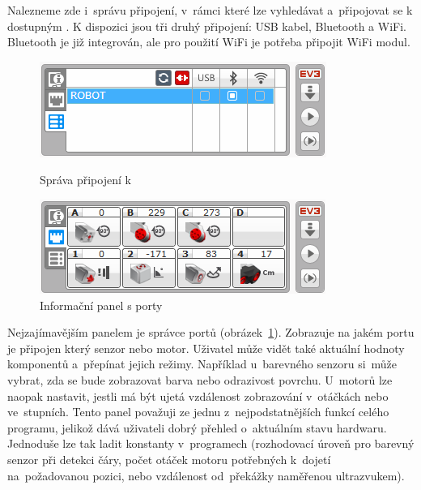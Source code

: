 Nalezneme zde i~správu připojení, v~rámci které lze vyhledávat a~připojovat se k dostupným . 
K dispozici jsou tři druhý připojení: USB kabel, Bluetooth a WiFi. Bluetooth je již integrován, ale pro použití WiFi je potřeba připojit WiFi modul.

\begin{figure}[h]
	\begin{minipage}[b]{.48\textwidth}
		\centering
		\includegraphics[width=\textwidth]{images/lego-soft_brick-manager_connected.png}
		\caption{Správa připojení k }
		\label{fig:lego-soft_brick-manager-connected}
	\end{minipage}
	\hfill
	\begin{minipage}[b]{.48\textwidth}
		\centering
		\includegraphics[width=\textwidth]{images/lego-soft_brick_port-view.png}
		\caption{Informační panel s porty}
		\label{fig:lego-soft_brick_port-view}
	\end{minipage}
\end{figure}

Nejzajímavějším panelem je správce portů (obrázek~\ref{fig:lego-soft_brick_port-view}). 
Zobrazuje na jakém portu je připojen který senzor nebo motor. 
Uživatel může vidět také aktuální hodnoty komponentů a~přepínat jejich režimy.    
Například u~barevného senzoru si~může vybrat, zda se bude zobrazovat barva nebo odrazivost povrchu. U~motorů lze naopak nastavit, jestli má být ujetá vzdálenost zobrazování v~otáčkách nebo ve~stupních. 
Tento panel považuji ze jednu z~nejpodstatnějších funkcí celého programu, jelikož dává uživateli dobrý přehled o~aktuálním stavu hardwaru. 
Jednoduše lze tak ladit konstanty v~programech (rozhodovací úroveň pro barevný senzor při detekci čáry, počet otáček motoru potřebných k~dojetí na~požadovanou pozici, nebo vzdálenost od~překážky naměřenou ultrazvukem). 

